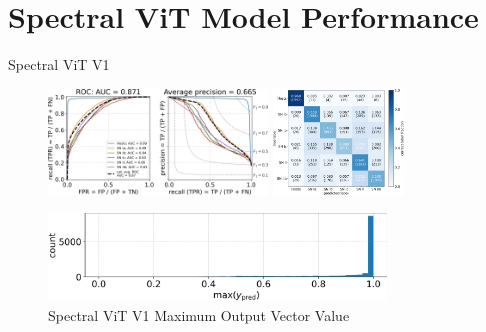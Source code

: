\section[Model Performance]{Spectral ViT Model Performance}
\begin{frame}{Spectral ViT V1}
    \begin{figure}
        \centering
        \includegraphics[height=2.8cm]{figures/v1_real/vit_model_V1_original_redorocfulle_e31.png}
        \quad
        \includegraphics[height=2.8cm]{figures/v1_real/vit_model_V1_original_redocmfull_e31.png}
        \caption{Spectral ViT V1 Classifier\label{fig:v1_qual}}
        \pause

        \includegraphics[width=0.8\textwidth]{figures/v1_real/vit_model_V1_original_redomax_ypred_binary_31.png}
        \caption{Spectral ViT V1 Maximum Output Vector Value\label{fig:v1_max}}
    \end{figure}
\end{frame}

